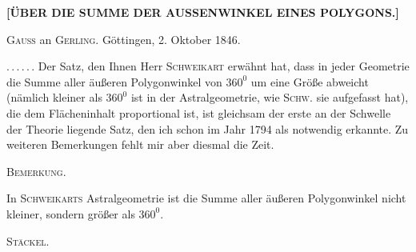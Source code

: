 \clearpage
{}%
\begin{center}
\textbf{[ÜBER DIE SUMME DER AUSSENWINKEL EINES POLYGONS.]}

\medskip
\textsc{Gauss} an \textsc{Gerling}. \quad Göttingen, 2. Oktober 1846.
\end{center}

\mbox{.\,.\,.\,.\,.\,.} Der Satz, den Ihnen Herr \textsc{Schweikart} erwähnt hat, dass in jeder Geometrie die Summe aller äußeren Polygonwinkel von $360^0$ um eine Größe abweicht (nämlich kleiner als $360^0$ ist in der Astralgeometrie, wie \textsc{Schw.} sie aufgefasst hat), die dem Flächeninhalt proportional ist, ist gleichsam der erste an der Schwelle der Theorie liegende Satz, den ich schon im Jahr 1794 als notwendig erkannte. Zu weiteren Bemerkungen fehlt mir aber diesmal die Zeit.

\begin{center}

\end{center}

\begin{center}\textsc{Bemerkung.}\end{center}

In \textsc{Schweikarts} Astralgeometrie ist die Summe aller äußeren Polygonwinkel nicht kleiner, sondern größer als $360^0$.

\hfill \textsc{Stäckel}.
